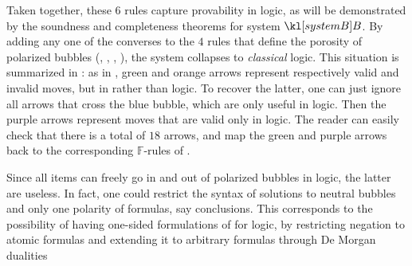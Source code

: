 \begin{description}
  Taken together, these $6$ rules capture provability in
  \emph{} logic, as will be demonstrated by the soundness and
  completeness theorems for system $\sysB$. By adding any one of the converses
  to the $4$ rules that define the porosity of polarized bubbles
  (, , ,
  ), the system collapses to \emph{classical} logic.
  This situation is summarized in : as in
  , green and orange arrows represent respectively valid
  and invalid moves, but in  rather than  logic.
  To recover the latter, one can just ignore all arrows that cross the blue
  bubble, which are only useful in  logic. Then the purple
  arrows represent moves that are valid only in  logic. The reader can
  easily check that there is a total of $18$ arrows, and map the green and
  purple arrows back to the corresponding $\mathbb{F}$-rules of
  .

  \begin{remark}
    Since all items can freely go in and out of polarized bubbles in 
    logic, the latter are useless. In fact, one could restrict the syntax of
    solutions to neutral bubbles and only one polarity of formulas, say
    conclusions. This corresponds to the possibility of having one-sided
    formulations of  for  logic, by restricting negation
    to atomic formulas and extending it to arbitrary formulas through De Morgan
    dualities
  \end{remark}
  

\end{description}
